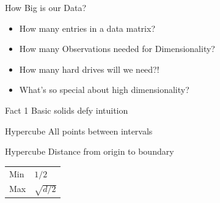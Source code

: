 \documentclass[14pt]{beamer}
\begin{document}

\begin{frame}{How Big is our Data?}
  \begin{itemize}
  \item<1-> How many entries in a data matrix?\\

    \bigskip
  \item<3-> How many Observations needed for Dimensionality?\\

    \bigskip
  \item<5-> How many hard drives will we need?!

    \bigskip
  \item<6> What's so special about high dimensionality?
  \end{itemize}
\end{frame}


\begin{frame}{Fact 1}
  Basic solids defy intuition
\end{frame}

\begin{frame}{Hypercube}
  All points between intervals
\end{frame}

\begin{frame}{Hypercube}
  Distance from origin to boundary

  \begin{tabular}{@{}ll@{}}
    Min & $1/2$ \\
    Max & $\sqrt{d/2}$
  \end{tabular}
\end{frame}
\end{document}
